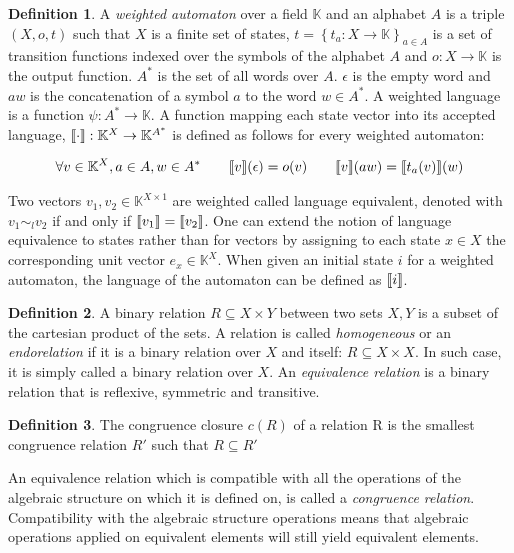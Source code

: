 \documentclass{article}
\theoremstyle{plain}%
\theoremstyle{definition}
\newtheorem{defn}{Definition}[section]
\theoremstyle{remark}
\def\K{\mathbb{K}}
\DeclarePairedDelimiter\sqmap{\llbracket}{\rrbracket}
\begin{document}
\begin{defn}
  A \textit{weighted automaton} over a field $\K$ and an alphabet $A$ is a triple 
  $(X,o,t)$ such that $X$ is a finite set of states, 
  $t = \left\lbrace t_a : X \to \K\right\rbrace_{a \in A}$
  is a set of transition functions indexed over the symbols of the alphabet $A$ and $o : X 
  \to \K$ is the output function. 
  $A^*$ is the set of all words over $A$. $\epsilon$ is the empty word and $aw$ is the
  concatenation of a symbol $a$ to the word $w \in A^*$.
  A weighted language is a function $\psi: A^* \to \K$.
  A function mapping each state vector into its 
  accepted language, $\sqmap{\cdot}: \K^X \to \K^{A^*}$ is defined as follows for every weighted automaton:

  \begin{equation*}
    \begin{aligned}
      \forall v \in \K^X, a \in A, w \in A^* \quad \quad
      \sqmap{v}(\epsilon) = o(v) \quad \quad
      \sqmap{v}(aw) = \sqmap{t_a(v)}(w)  
    \end{aligned}
  \end{equation*}
\end{defn}

Two vectors $v_1, v_2 \in \K^{X\times 1}$ are weighted called language equivalent, denoted with 
$v_1 \sim_l v_2 $ if and only if $ \sqmap
{v_1} = \sqmap{v_2}$. One can extend the notion of language equivalence to states rather
than for vectors by assigning to each state $x \in X$ the corresponding unit vector 
$e_x \in \K^X$. When given an initial state $i$ for a weighted automaton, the language 
of the automaton can be defined as $\sqmap{i}$.


\begin{defn}
  A binary relation $R \subseteq X \times Y$ between two sets $X, Y$ is a subset of the 
  cartesian product of the sets. A relation is called \textit{homogeneous} or an \textit
  {endorelation} if it is a binary relation over $X$ and itself: $R \subseteq X \times
   X$. 
  In such case, it is simply called a binary relation over $X$.
  An \textit{equivalence relation} is a binary relation that is reflexive, symmetric and
  transitive. 
\end{defn}

\begin{defn}
  The congruence closure $c(R)$ of a relation R is the smallest congruence relation 
  $R'$ such that $R \subseteq R'$ 
\end{defn}

An equivalence relation which is compatible with all the operations of
the algebraic structure on which it is defined on, is called a 
\textit{congruence relation}. Compatibility with the algebraic structure operations
means that algebraic operations applied on equivalent elements will still
yield equivalent elements. 
\end{document}
